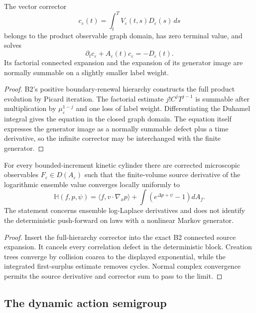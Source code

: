 \begin{lemma}
\label{lem:r10-b4-corrector}
The vector corrector
\[
 c_\varepsilon(t)
 =\int_t^T V_\varepsilon(t,s)D_\varepsilon(s)\,ds
\]
belongs to the product observable graph domain, has zero terminal value, and
solves
\[
 \partial_tc_\varepsilon+A_\varepsilon(t)c_\varepsilon
 =-D_\varepsilon(t).
\]
Its factorial connected expansion and the expansion of its generator image
are normally summable on a slightly smaller label weight.
\end{lemma}

\begin{proof}
B2's positive boundary-renewal hierarchy constructs the full product
evolution by Picard iteration.  The factorial estimate
$j!C^jT^{j-1}$ is summable after multiplication by
$\mu_\varepsilon^{1-j}$ and one loss of label weight.  Differentiating the
Duhamel integral gives the equation in the closed graph domain.  The equation
itself expresses the generator image as a normally summable defect plus a
time derivative, so the infinite corrector may be interchanged with the
finite generator.
\end{proof}

\begin{theorem}
\label{thm:r10-b4-hamiltonian}
For every bounded-increment kinetic cylinder there are corrected microscopic
observables $F_\varepsilon\in D(A_\varepsilon)$ such that the finite-volume
source derivative of the logarithmic ensemble value converges locally
uniformly to
\[
 \mathbb H(f,p,\psi)
 =\langle f,v\cdot\nabla_xp\rangle
 +\int\left(e^{\Delta p+\psi}-1\right)dA_f.
\]
The statement concerns ensemble log-Laplace derivatives and does not identify
the deterministic push-forward on laws with a nonlinear Markov generator.
\end{theorem}

\begin{proof}
Insert the full-hierarchy corrector into the exact B2 connected source
expansion.  It cancels every correlation defect in the deterministic block.
Creation trees converge by collision coarea to the displayed exponential,
while the integrated first-surplus estimate removes cycles.  Normal complex
convergence permits the source derivative and corrector sum to pass to the
limit.
\end{proof}

\subsection{The dynamic action semigroup}

